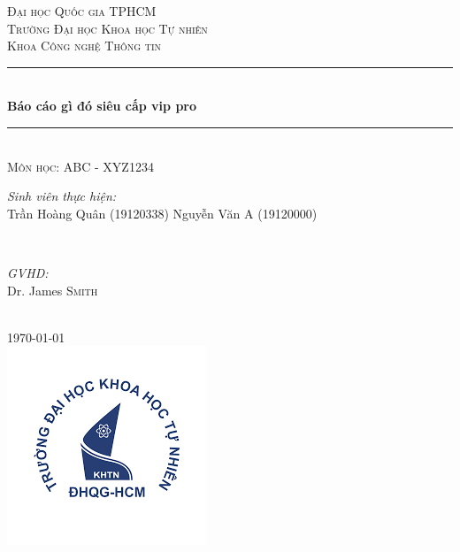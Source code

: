 \documentclass[12pt]{article}
\begin{document}
\begin{titlepage}
\newcommand{\HRule}{\rule{\linewidth}{0.5mm}} %

\centering %


\textsc{\LARGE Đại học Quốc gia TPHCM}\\[1.5cm] %
\textsc{\Large Trường Đại học Khoa học Tự nhiên}\\[0.5cm] %
\textsc{\large Khoa Công nghệ Thông tin}\\[0.5cm] %


\HRule \\[0.4cm]
{ \huge \bfseries Báo cáo gì đó siêu cấp vip pro}\\[0.4cm]
\HRule \\[1.5cm]

\textsc{Môn học: ABC - XYZ1234}\\[0.5cm]

\begin{minipage}{0.4\textwidth}
\begin{flushleft} \large
\emph{Sinh viên thực hiện:}\\
Trần Hoàng Quân \textsc{(19120338)} %
Nguyễn Văn A \textsc{(19120000)}
\end{flushleft}
\end{minipage}
~
\begin{minipage}{0.4\textwidth}
\begin{flushright} \large
\emph{GVHD:} \\
Dr. James \textsc{Smith} %
\end{flushright}
\end{minipage}\\[2cm]

{\large \today}\\[2cm]

\includegraphics{hcmus-logo.png}\\[1cm] 

\vfill %
\end{titlepage}
	
\end{document}
